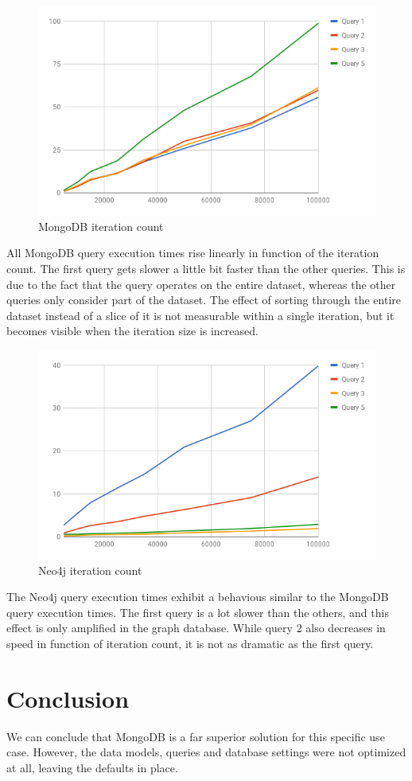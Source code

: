 \begin{figure}[H]
  \centering
  \includegraphics[width=.8\textwidth]{img/mongodb-iteration-count.png}
  \caption{MongoDB iteration count}
  \label{fig:mongodb-iteration-count}
\end{figure}

All MongoDB query execution times rise linearly in function of the iteration count.
The first query gets slower a little bit faster than the other queries.
This is due to the fact that the query operates on the entire dataset, whereas the other queries only consider part of the dataset.
The effect of sorting through the entire dataset instead of a slice of it is not measurable within a single iteration, but it becomes visible when the iteration size is increased.

\begin{figure}[H]
  \centering
  \includegraphics[width=.8\textwidth]{img/neo4j-iteration-count.png}
  \caption{Neo4j iteration count}
  \label{fig:neo4j-iteration-count}
\end{figure}

The Neo4j query execution times exhibit a behavious similar to the MongoDB query execution times.
The first query is a lot slower than the others, and this effect is only amplified in the graph database.
While query 2 also decreases in speed in function of iteration count, it is not as dramatic as the first query.

\section{Conclusion}
\label{sec:empirical-study-conclusion}

We can conclude that MongoDB is a far superior solution for this specific use case.
However, the data models, queries and database settings were not optimized at all, leaving the defaults in place.
